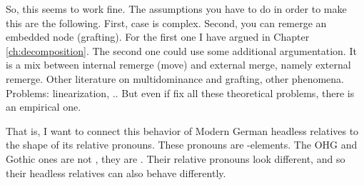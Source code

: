 So, this seems to work fine. The assumptions you have to do in order to make this are the following. First, case is complex. Second, you can remerge an embedded node (grafting). For the first one I have argued in Chapter \ref{ch:decomposition}. The second one could use some additional argumentation. It is a mix between internal remerge (move) and external merge, namely external remerge. Other literature on multidominance and grafting, other phenomena. Problems: linearization, .. But even if fix all these theoretical problems, there is an empirical one.

That is, I want to connect this behavior of Modern German headless relatives to the shape of its relative pronouns. These pronouns are -elements. The OHG and Gothic ones are not , they are . Their relative pronouns look different, and so their headless relatives can also behave differently.
